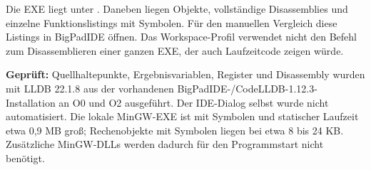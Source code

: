 \documentclass[11pt,a4paper]{article}
\begin{document}
Die EXE liegt unter . Daneben liegen
Objekte, vollständige Disassemblies und einzelne Funktionslistings mit Symbolen.
Für den manuellen Vergleich diese Listings in BigPadIDE öffnen. Das
Workspace-Profil verwendet nicht den Befehl zum Disassemblieren einer ganzen
EXE, der auch Laufzeitcode zeigen würde.

\textbf{Geprüft:} Quellhaltepunkte, Ergebnisvariablen, Register und Disassembly
wurden mit LLDB 22.1.8 aus der vorhandenen BigPadIDE-/CodeLLDB-1.12.3-Installation
an O0 und O2 ausgeführt. Der IDE-Dialog selbst wurde nicht automatisiert.
Die lokale MinGW-EXE ist mit Symbolen und statischer Laufzeit etwa 0,9 MB groß;
Rechenobjekte mit Symbolen liegen bei etwa 8 bis 24 KB. Zusätzliche MinGW-DLLs
werden dadurch für den Programmstart nicht benötigt.
\end{document}
